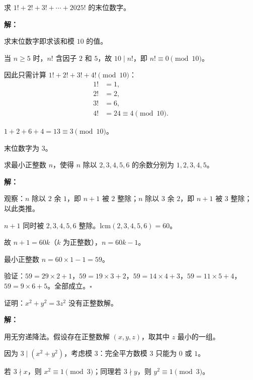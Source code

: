 \documentclass[12pt, a4paper]{ctexart}
\begin{document}
\begin{examplebox}[【例题11】同余的综合应用]
求 $1! + 2! + 3! + \cdots + 2025!$ 的末位数字。
\end{examplebox}

\textbf{解：}

求末位数字即求该和模 $10$ 的值。

当 $n \geqslant 5$ 时，$n!$ 含因子 $2$ 和 $5$，故 $10 \mid n!$，即 $n! \equiv 0 \pmod{10}$。

因此只需计算 $1! + 2! + 3! + 4! \pmod{10}$：
\begin{align*}
1! &= 1, \\
2! &= 2, \\
3! &= 6, \\
4! &= 24 \equiv 4 \pmod{10}.
\end{align*}

$1 + 2 + 6 + 4 = 13 \equiv 3 \pmod{10}$。

末位数字为 $\boxed{3}$。

\begin{examplebox}[【例题12】中国剩余定理进阶]
求最小正整数 $n$，使得 $n$ 除以 $2, 3, 4, 5, 6$ 的余数分别为 $1, 2, 3, 4, 5$。
\end{examplebox}

\textbf{解：}

观察：$n$ 除以 $2$ 余 $1$，即 $n + 1$ 被 $2$ 整除；$n$ 除以 $3$ 余 $2$，即 $n + 1$ 被 $3$ 整除；以此类推。

$n + 1$ 同时被 $2, 3, 4, 5, 6$ 整除。$\text{lcm}(2, 3, 4, 5, 6) = 60$。

故 $n + 1 = 60k$（$k$ 为正整数），$n = 60k - 1$。

最小正整数 $n = 60 \times 1 - 1 = \boxed{59}$。

验证：$59 = 29 \times 2 + 1$，$59 = 19 \times 3 + 2$，$59 = 14 \times 4 + 3$，$59 = 11 \times 5 + 4$，$59 = 9 \times 6 + 5$。全部成立。\hfill $\square$

\begin{examplebox}[【例题13】勾股数与不定方程]
证明：$x^2 + y^2 = 3z^2$ 没有正整数解。
\end{examplebox}

\textbf{解：}

用无穷递降法。假设存在正整数解 $(x, y, z)$，取其中 $z$ 最小的一组。

因为 $3 \mid (x^2 + y^2)$，考虑模 $3$：完全平方数模 $3$ 只能为 $0$ 或 $1$。

若 $3 \nmid x$，则 $x^2 \equiv 1 \pmod{3}$；同理若 $3 \nmid y$，则 $y^2 \equiv 1 \pmod{3}$。
\end{document}

